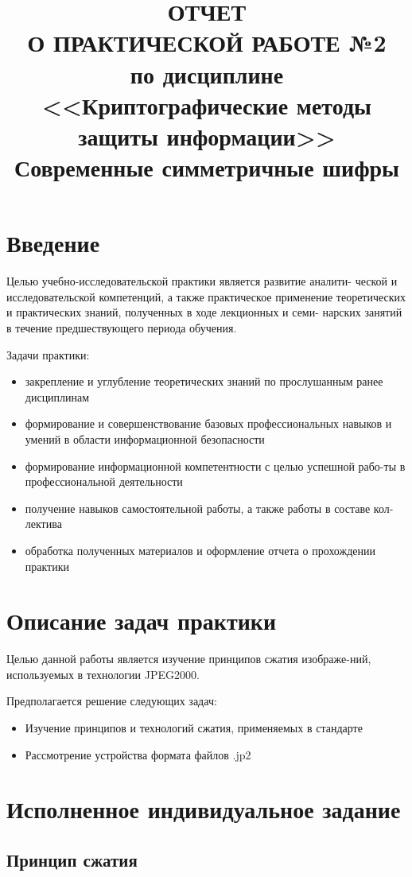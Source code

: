 \documentclass[a4paper]{article}
\title{
  ОТЧЕТ \\
  О ПРАКТИЧЕСКОЙ РАБОТЕ №2 \\
  по дисциплине <<Криптографические методы защиты информации>> \\
  Современные симметричные шифры
}
\begin{document}
  \toc

  \section{Введение}

  Целью учебно-исследовательской практики является развитие аналити-
  ческой и исследовательской компетенций, а также практическое применение
  теоретических и практических знаний, полученных в ходе лекционных и семи-
  нарских занятий в течение предшествующего периода обучения.

  Задачи практики:

  \begin{itemize}
    \item закрепление и углубление теоретических знаний по прослушанным ранее дисциплинам
    \item формирование и совершенствование базовых профессиональных навыков и умений в области информационной безопасности
    \item формирование информационной компетентности с целью успешной рабо-ты в профессиональной деятельности
    \item получение навыков самостоятельной работы, а также работы в составе кол-лектива
    \item обработка полученных материалов и оформление отчета о прохождении практики
  \end{itemize}

  \newpage
  \section{Описание задач практики}

  Целью данной работы является изучение принципов сжатия изображе-ний,
  используемых в технологии JPEG2000.

  Предполагается решение следующих задач:
  \begin{itemize}
    \item Изучение принципов и технологий сжатия, применяемых в стандарте
    \item Рассмотрение устройства формата файлов .jp2
  \end{itemize}

  \newpage
  \section{Исполненное индивидуальное задание}

  \subsection{Принцип сжатия}
\end{document}
